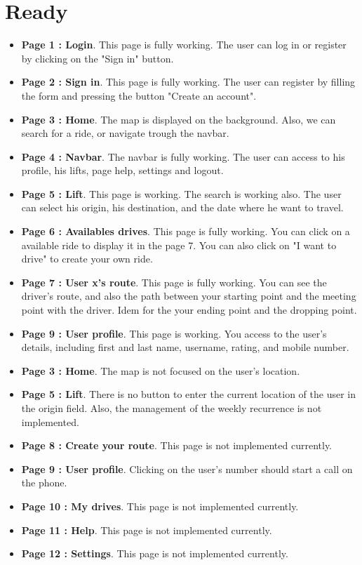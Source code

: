 \section{Ready}
\begin{itemize}
	\item {\bf Page 1 : Login}. This page is fully working. The user can log in or register by clicking on the "Sign in" button.
	\item {\bf Page 2 : Sign in}. This page is fully working. The user can register by filling the form and pressing the button "Create an account".
	\item {\bf Page 3 : Home}. The map is displayed on the background. Also, we can search for a ride, or navigate trough the navbar.
	\item {\bf Page 4 : Navbar}. The navbar is fully working. The user can access to his profile, his lifts, page help, settings and logout.
	\item {\bf Page 5 : Lift}. This page is working. The search is working also. The user can select his origin, his destination, and the date where he want to travel.
	\item {\bf Page 6 : Availables drives}. This page is fully working. You can click on a available ride to display it in the page 7. You can also click on "I want to drive" to create your own ride.
	\item {\bf Page 7 : User x's route}. This page is fully working. You can see the driver's route, and also the path between your starting point and the meeting point with the driver. Idem for the your ending point and the dropping point.
	\item {\bf Page 9 : User profile}. This page is working. You access to the user's details, including first and last name, username, rating, and mobile number.

\item {\bf Page 3 : Home}. The map is not focused on the user's location.
\item {\bf Page 5 : Lift}. There is no button to enter the current location of the user in the origin field. Also, the management of the weekly recurrence is not implemented.
	\item {\bf Page 8 : Create your route}. This page is not implemented currently.
	\item {\bf Page 9 : User profile}. Clicking on the user's number should start a call on the phone.
	 \item {\bf Page 10 : My drives}. This page is not implemented currently.
	 \item {\bf Page 11 : Help}. This page is not implemented currently.
	 \item {\bf Page 12 : Settings}. This page is not implemented currently.
\end{itemize}

